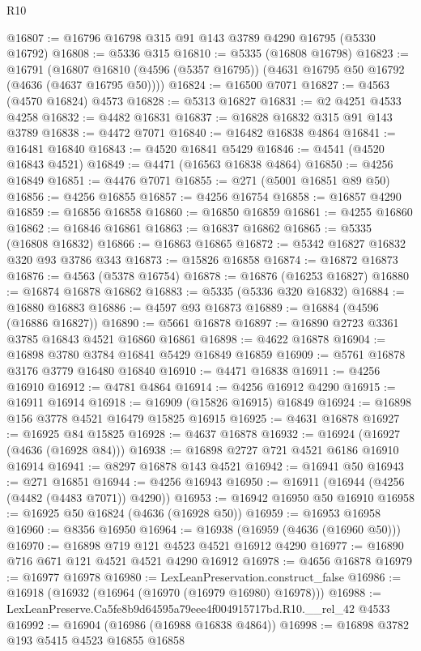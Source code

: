\begin{lexlean}{R10}
\begin{coremodule}
@16807 := @16796 @16798 @315 @91 @143 @3789 @4290 @16795 (@5330 @16792)
@16808 := @5336 @315
@16810 := @5335 (@16808 @16798)
@16823 := @16791
    (@16807 @16810 (@4596 (@5357 @16795)) (@4631 @16795 @50 @16792 (@4636 (@4637 @16795 @50))))
@16824 := @16500 @7071
@16827 := @4563 (@4570 @16824) @4573
@16828 := @5313 @16827
@16831 := @2 @4251 @4533 @4258
@16832 := @4482 @16831
@16837 := @16828 @16832 @315 @91 @143 @3789
@16838 := @4472 @7071
@16840 := @16482 @16838 @4864
@16841 := @16481 @16840
@16843 := @4520 @16841 @5429
@16846 := @4541 (@4520 @16843 @4521)
@16849 := @4471 (@16563 @16838 @4864)
@16850 := @4256 @16849
@16851 := @4476 @7071
@16855 := @271 (@5001 @16851 @89 @50)
@16856 := @4256 @16855
@16857 := @4256 @16754
@16858 := @16857 @4290
@16859 := @16856 @16858
@16860 := @16850 @16859
@16861 := @4255 @16860
@16862 := @16846 @16861
@16863 := @16837 @16862
@16865 := @5335 (@16808 @16832)
@16866 := @16863 @16865
@16872 := @5342 @16827 @16832 @320 @93 @3786 @343
@16873 := @15826 @16858
@16874 := @16872 @16873
@16876 := @4563 (@5378 @16754)
@16878 := @16876 (@16253 @16827)
@16880 := @16874 @16878 @16862
@16883 := @5335 (@5336 @320 @16832)
@16884 := @16880 @16883
@16886 := @4597 @93 @16873
@16889 := @16884 (@4596 (@16886 @16827))
@16890 := @5661 @16878
@16897 := @16890 @2723 @3361 @3785 @16843 @4521 @16860 @16861
@16898 := @4622 @16878
@16904 := @16898 @3780 @3784 @16841 @5429 @16849 @16859
@16909 := @5761 @16878 @3176 @3779 @16480 @16840
@16910 := @4471 @16838
@16911 := @4256 @16910
@16912 := @4781 @4864
@16914 := @4256 @16912 @4290
@16915 := @16911 @16914
@16918 := @16909 (@15826 @16915) @16849
@16924 := @16898 @156 @3778 @4521 @16479 @15825 @16915
@16925 := @4631 @16878
@16927 := @16925 @84 @15825
@16928 := @4637 @16878
@16932 := @16924 (@16927 (@4636 (@16928 @84)))
@16938 := @16898 @2727 @721 @4521 @6186 @16910 @16914
@16941 := @8297 @16878 @143 @4521
@16942 := @16941 @50
@16943 := @271 @16851
@16944 := @4256 @16943
@16950 := @16911 (@16944 (@4256 (@4482 (@4483 @7071)) @4290))
@16953 := @16942 @16950 @50 @16910
@16958 := @16925 @50 @16824 (@4636 (@16928 @50))
@16959 := @16953 @16958
@16960 := @8356 @16950
@16964 := @16938 (@16959 (@4636 (@16960 @50)))
@16970 := @16898 @719 @121 @4523 @4521 @16912 @4290
@16977 := @16890 @716 @671 @121 @4521 @4521 @4290 @16912
@16978 := @4656 @16878
@16979 := @16977 @16978
@16980 := LexLeanPreservation.construct_false
@16986 := @16918 (@16932 (@16964 (@16970 (@16979 @16980) @16978)))
@16988 := LexLeanPreserve.Ca5fe8b9d64595a79eee4f004915717bd.R10.__rel_42 @4533
@16992 := @16904 (@16986 (@16988 @16838 @4864))
@16998 := @16898 @3782 @193 @5415 @4523 @16855 @16858

\end{coremodule}
\end{lexlean}
